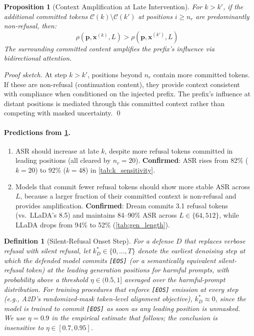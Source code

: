 \documentclass{article}
\theoremstyle{coloredthm}
\newtheorem{definition}{Definition}
\newtheorem{proposition}{Proposition}
\begin{document}
\begin{proposition}[Context Amplification at Late Intervention]
\label{prop:attack}
For $k > k'$, if the additional committed tokens $\mathcal{C}(k) \setminus \mathcal{C}(k')$ at positions $i \geq n_r$ are predominantly non-refusal, then:
\begin{equation}
\rho(\mathbf{p}, \mathbf{x}^{(k)}, L) > \rho(\mathbf{p}, \mathbf{x}^{(k')}, L)
\end{equation}
The surrounding committed content amplifies the prefix's influence via bidirectional attention.
\end{proposition}

\textit{Proof sketch.} At step $k > k'$, positions beyond $n_r$ contain more committed tokens. If these are non-refusal (continuation content), they provide context consistent with compliance when conditioned on the injected prefix. The prefix's influence at distant positions is mediated through this committed context rather than competing with masked uncertainty. \qed

\paragraph{Predictions from \cref{prop:attack}.}
\begin{enumerate}
    \item[\textbf{P3.}] ASR should increase at late $k$, despite more refusal tokens committed in leading positions (all cleared by $n_r{=}20$). \textbf{Confirmed}: ASR rises from 82\% ($k{=}20$) to 92\% ($k{=}48$) in \cref{tab:k_sensitivity}.
    \item[\textbf{P4.}] Models that commit fewer refusal tokens should show more stable ASR across $L$, because a larger fraction of their committed context is non-refusal and provides amplification. \textbf{Confirmed}: Dream commits 3.1 refusal tokens (vs.\ LLaDA's 8.5) and maintains 84--90\% ASR across $L \in \{64, 512\}$, while LLaDA drops from 94\% to 52\% (\cref{tab:gen_length}).
\end{enumerate}

\begin{definition}[Silent-Refusal Onset Step]
\label{def:kstar}
For a defense $D$ that replaces verbose refusal with silent refusal, let $k^*_D \in \{0, \ldots, T\}$ denote the earliest denoising step at which the defended model commits \texttt{[EOS]} (or a semantically equivalent silent-refusal token) at the leading generation positions for harmful prompts, with probability above a threshold $\eta \in (0.5, 1]$ averaged over the harmful-prompt distribution. For training procedures that enforce \texttt{[EOS]} emission at every step (e.g., A2D's randomized-mask token-level alignment objective), $k^*_D \approx 0$, since the model is trained to commit \texttt{[EOS]} as soon as any leading position is unmasked. We use $\eta = 0.9$ in the empirical estimate that follows; the conclusion is insensitive to $\eta \in [0.7, 0.95]$.
\end{definition}
\end{document}

